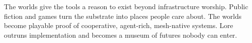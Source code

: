 \ProjectionBand
{The worlds give the tools a reason to exist beyond infrastructure worship.}
{Public fiction and games turn the substrate into places people care about.}
{The worlds become playable proof of cooperative, agent-rich, mesh-native systems.}
{Lore outruns implementation and becomes a museum of futures nobody can enter.}

